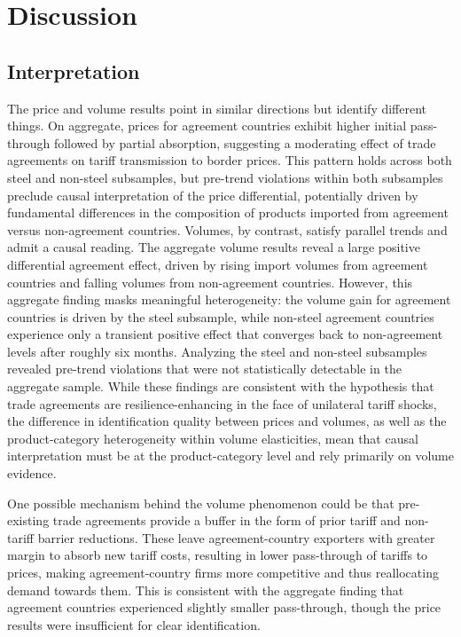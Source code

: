 \section{Discussion}\label{sec:discussion}

\subsection{Interpretation}\label{sec:interpretation}

The price and volume results point in similar directions but identify different things. On aggregate, prices for agreement countries exhibit higher initial pass-through followed by partial absorption, suggesting a moderating effect of trade agreements on tariff transmission to border prices. This pattern holds across both steel and non-steel subsamples, but pre-trend violations within both subsamples preclude causal interpretation of the price differential, potentially driven by fundamental differences in the composition of products imported from agreement versus non-agreement countries. Volumes, by contrast, satisfy parallel trends and admit a causal reading. The aggregate volume results reveal a large positive differential agreement effect, driven by rising import volumes from agreement countries and falling volumes from non-agreement countries. However, this aggregate finding masks meaningful heterogeneity: the volume gain for agreement countries is driven by the steel subsample, while non-steel agreement countries experience only a transient positive effect that converges back to non-agreement levels after roughly six months. Analyzing the steel and non-steel subsamples revealed pre-trend violations that were not statistically detectable in the aggregate sample. While these findings are consistent with the hypothesis that trade agreements are resilience-enhancing in the face of unilateral tariff shocks, the difference in identification quality between prices and volumes, as well as the product-category heterogeneity within volume elasticities, mean that causal interpretation must be at the product-category level and rely primarily on volume evidence. 

One possible mechanism behind the volume phenomenon could be that pre-existing trade agreements provide a buffer in the form of prior tariff and non-tariff barrier reductions. These leave agreement-country exporters with greater margin to absorb new tariff costs, resulting in lower pass-through of tariffs to prices, making agreement-country firms more competitive and thus reallocating demand towards them. This is consistent with the aggregate finding that agreement countries experienced slightly smaller pass-through, though the price results were insufficient for clear identification. 


